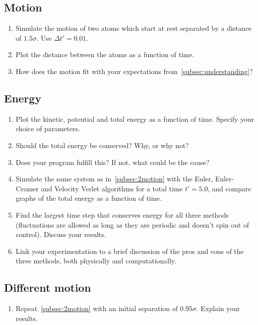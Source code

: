 \documentclass[11pt,british,a4paper]{report}
\begin{document}
\subsection{Motion}\label{subsec:2motion}
\begin{enumerate}[label=\roman*.]
    \item Simulate the motion of two atoms which start at rest separated by a distance of \(\num{1.5}\sigma\). Use \(\Delta t'=\num{0.01}\).
    \item Plot the distance between the atoms as a function of time.
    \item How does the motion fit with your expectations from~\vref{subsec:understanding}?
\end{enumerate}

\subsection{Energy}
\begin{enumerate}[label=\roman*.]
    \item Plot the kinetic, potential and total energy as a function of time. Specify your choice of parameters.
    \item Should the total energy be conserved? Why, or why not?
    \item Does your program fulfill this? If not, what could be the cause?
    \item Simulate the same system as in~\vref{subsec:2motion} with the Euler, Euler-Cromer and Velocity Verlet algorithms for a total time \(t' = 5.0\), and compare graphs of the total energy as a function of time.
    \item Find the largest time step that conserves energy for all three methods (fluctuations are allowed as long as they are periodic and doesn't spin out of control). Discuss your results.
    \item Link your experimentation to a brief discussion of the pros and cons of the three methods, both physically and computationally.
\end{enumerate}

\subsection{Different motion}
\begin{enumerate}[label=\roman*.]
    \item Repeat~\vref{subsec:2motion} with an initial separation of \(\num{0.95}\sigma\). Explain your results.
\end{enumerate}
\end{document}
